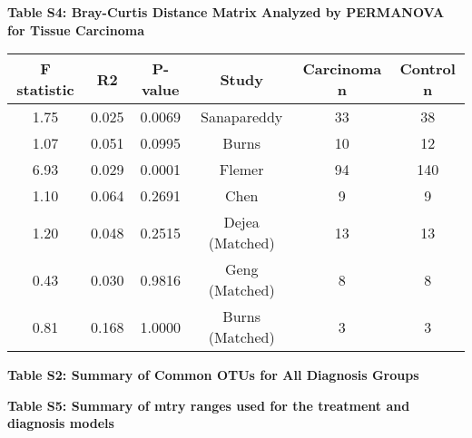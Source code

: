 \documentclass[12pt,]{article}
\begin{document}
\newpage

\textbf{Table S4: Bray-Curtis Distance Matrix Analyzed by PERMANOVA for
Tissue Carcinoma}

\begin{longtable}[]{@{}cccccc@{}}
\toprule
F statistic & R2 & P-value & Study & Carcinoma n & Control
n\tabularnewline
\midrule
\endhead
1.75 & 0.025 & 0.0069 & Sanapareddy & 33 & 38\tabularnewline
1.07 & 0.051 & 0.0995 & Burns & 10 & 12\tabularnewline
6.93 & 0.029 & 0.0001 & Flemer & 94 & 140\tabularnewline
1.10 & 0.064 & 0.2691 & Chen & 9 & 9\tabularnewline
1.20 & 0.048 & 0.2515 & Dejea (Matched) & 13 & 13\tabularnewline
0.43 & 0.030 & 0.9816 & Geng (Matched) & 8 & 8\tabularnewline
0.81 & 0.168 & 1.0000 & Burns (Matched) & 3 & 3\tabularnewline
\bottomrule
\end{longtable}

\newpage

\newcommand{\blandscape}{\begin{landscape}}
\newcommand{\elandscape}{\end{landscape}}

\textbf{Table S2: Summary of Common OTUs for All Diagnosis Groups}

\footnotesize

\normalsize
\newpage

\textbf{Table S5: Summary of mtry ranges used for the treatment and
diagnosis models}

\footnotesize

\normalsize
\end{document}
